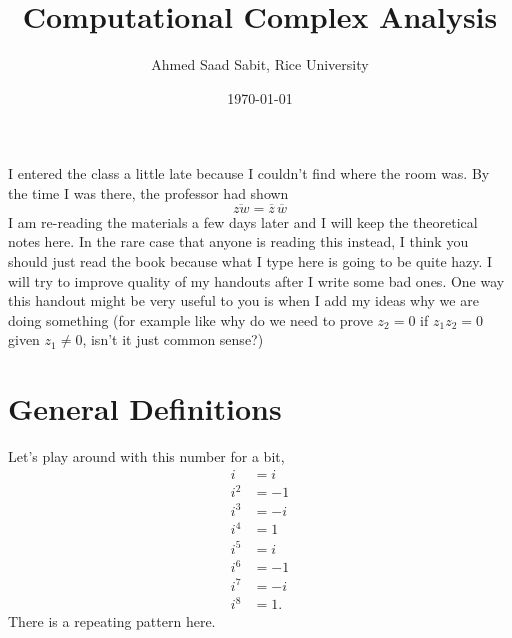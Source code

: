 \documentclass[letter]{article}
\title{Computational Complex Analysis}
\author{Ahmed Saad Sabit, Rice University}
\date{\today}
\begin{document}
\maketitle

I entered the class a little late because I couldn't find where the room was. By the time I was there, the professor had shown \[
	\overline{zw} = \overline{z} \, \overline{w}
	\] 
I am re-reading the materials a few days later and I will keep the theoretical notes here. In the rare case that anyone is reading this instead, I think you should just read the book because what I type here is going to be quite hazy. I will try to improve quality of my handouts after I write some bad ones. One way this handout might be very useful to you is when I add my ideas why we are doing something (for example like why do we need to prove $z_2 = 0$ if $z_1 z_2 = 0$ given $ z_1 \neq  0$, isn't it just common sense?)

\section{General Definitions}
Let's play around with this number for a bit, 
\begin{align*}
	i &= i \\
	i^2 &= -1 \\
	i^3 &= -i \\
	i^{4} &= 1 \\
	i^{5} &= i \\
	i^{6} &= -1 \\
	i^{7} &= -i \\
	i ^{8} &= 1 
.\end{align*}
There is a repeating pattern here. 


\end{document}
